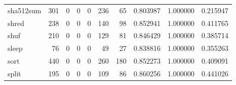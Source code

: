 \begin{longtable}{lrrrrrrrrr}
sha512sum &                                   301 &                                                  0 &                                                  0 &                                                  0 &                                                236 &                                                 65 &                                           0.803987 &                               1.000000 &                             0.215947 \\
shred     &                                   238 &                                                  0 &                                                  0 &                                                  0 &                                                140 &                                                 98 &                                           0.852941 &                               1.000000 &                             0.411765 \\
shuf      &                                   210 &                                                  0 &                                                  0 &                                                  0 &                                                129 &                                                 81 &                                           0.846429 &                               1.000000 &                             0.385714 \\
sleep     &                                    76 &                                                  0 &                                                  0 &                                                  0 &                                                 49 &                                                 27 &                                           0.838816 &                               1.000000 &                             0.355263 \\
sort      &                                   440 &                                                  0 &                                                  0 &                                                  0 &                                                260 &                                                180 &                                           0.852273 &                               1.000000 &                             0.409091 \\
split     &                                   195 &                                                  0 &                                                  0 &                                                  0 &                                                109 &                                                 86 &                                           0.860256 &                               1.000000 &                             0.441026 \\

\end{longtable}

